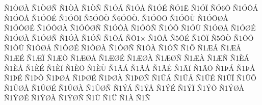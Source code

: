 {^^d11^^d2^^d8^^c0
^^d11^^d2^^d8^^d1
^^d11^^d2^^c0
^^d11^^d2^^d1
^^d11^^d3^^c1
^^d11^^d3^^c5
^^d11^^d3^^c9
^^d1^^d31^^cb
^^d11^^d3^^cf
^^d1^^d36^^d4
^^d11^^d3^^d4^^c1
^^d11^^d3^^d4^^c5
^^d11^^d3^^d4^^c9
^^d11^^d3^^d4^^cf
^^d15^^d3^^d4^^d2
^^d16^^d3^^d4^^d2.
^^d11^^d3^^d4^^d5
^^d11^^d3^^d4^^d9
^^d11^^d3^^d4^^d8^^c5
^^d11^^d3^^d4^^d8^^c9
^^d11^^d3^^d4^^d8^^c0
^^d11^^d3^^d4^^d8^^d1
^^d11^^d3^^d4^^c0
^^d11^^d3^^d4^^d1
^^d11^^d3^^d5
^^d11^^d3^^d9
^^d11^^d3^^d8^^c5
^^d11^^d3^^d8^^c9
^^d11^^d3^^d8^^c0
^^d11^^d3^^d8^^d1
^^d11^^d3^^c0
^^d11^^d3^^d1
^^d11^^d4^^c1
^^d1^^d41^^d7
^^d11^^d4^^c5
^^d15^^d4^^c9
^^d11^^d4^^cf
^^d15^^d4^^d2
^^d11^^d4^^d5
^^d11^^d4^^d9
^^d11^^d4^^d8^^c5
^^d11^^d4^^d8^^c9
^^d11^^d4^^d8^^c0
^^d11^^d4^^d8^^d1
^^d11^^d4^^c0
^^d11^^d4^^d1
^^d11^^d5
^^d11^^c6^^c1
^^d11^^c6^^c5
^^d11^^c6^^c9
^^d11^^c6^^cf
^^d11^^c6^^d5
^^d11^^c6^^d8^^c5
^^d11^^c6^^d8^^c9
^^d11^^c6^^d8^^c0
^^d11^^c6^^d8^^d1
^^d11^^c6^^c0
^^d11^^c6^^d1
^^d11^^c8^^c1
^^d11^^c8^^c5
^^d11^^c8^^c9
^^d11^^c8^^cf
^^d11^^c8^^d5
^^d11^^c8^^d9
^^d11^^c3^^c1
^^d11^^c3^^c5
^^d11^^c3^^c9
^^d11^^c3^^cf
^^d11^^c3^^d5
^^d11^^de^^c1
^^d11^^de^^c5
^^d11^^de^^c9
^^d11^^de^^d5
^^d11^^de^^d8^^c5
^^d11^^de^^d8^^c9
^^d11^^de^^d8^^c0
^^d11^^de^^d8^^d1
^^d11^^db^^c1
^^d11^^db^^c5
^^d11^^db^^c9
^^d11^^db^^cf
^^d11^^db^^d5
^^d11^^db^^d8^^c5
^^d11^^db^^d8^^c9
^^d11^^db^^d8^^c0
^^d11^^db^^d8^^d1
^^d11^^dd^^c1
^^d11^^dd^^c5
^^d11^^dd^^c9
^^d11^^dd^^cf
^^d11^^dd^^d5
^^d11^^dd^^d8^^c5
^^d11^^dd^^d8^^c9
^^d11^^dd^^d8^^c0
^^d11^^dd^^d8^^d1
^^d11^^d9
^^d11^^dc
^^d11^^c0
^^d11^^d1
}

